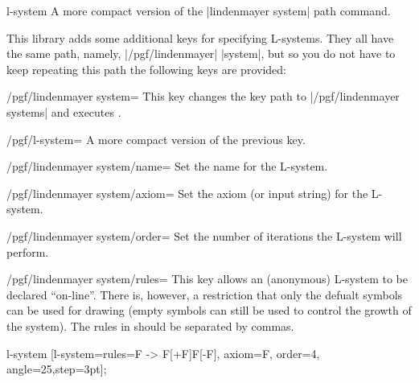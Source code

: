 \begin{pathoperation}{l-system}{ }
  A more compact version of the |lindenmayer system| path command.
\end{pathoperation}

This library adds some additional keys for specifying L-systems. They
all have the same path, namely, |/pgf/lindenmayer| |system|, but so 
you do not have to keep repeating this path the following keys are 
provided:
 
\begin{stylekey}{/pgf/lindenmayer system=}
This key changes the key path to |/pgf/lindenmayer systems| and
executes .
\end{stylekey}

\begin{stylekey}{/pgf/l-system=}
A more compact version of the previous key.
\end{stylekey}

\begin{key}{/pgf/lindenmayer system/name=}
  Set the name for the L-system. 
\end{key}

\begin{key}{/pgf/lindenmayer system/axiom=}
  Set the axiom (or input string) for the L-system. 
\end{key}

\begin{key}{/pgf/lindenmayer system/order=}
  Set the number of iterations the L-system will perform.
\end{key}

\begin{key}{/pgf/lindenmayer system/rules=}
  This key allows an (anonymous) L-system to be declared ``on-line''.
  There is, however, a restriction that only the defualt symbols can be
  used for drawing (empty symbols can still be used to control
  the growth of the system). The rules in  should
  be separated by commas.
  
\begin{codeexample}[]
\tikz[rotate=65] l-system
  [l-system={rules={F -> F[+F]F[-F]}, axiom=F, order=4, angle=25,step=3pt}];
\end{codeexample} 
\end{key}

